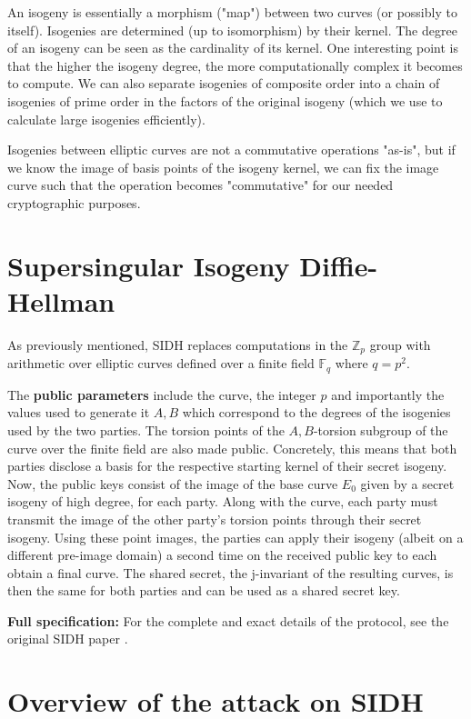 \documentclass[a4paper,11pt,oneside]{report}
\newcommand{\zp}{$\mathbb{Z}_p$\xspace}
\begin{document}
    An isogeny is essentially a morphism ("map") between two curves (or possibly to itself). Isogenies are determined (up to isomorphism) by their kernel. The degree of an isogeny can be seen as the cardinality of its kernel. One interesting point is that the higher the isogeny degree, the more computationally complex it becomes to compute. We can also separate isogenies of composite order into a chain of isogenies of prime order in the factors of the original isogeny (which we use to calculate large isogenies efficiently).

    Isogenies between elliptic curves are not a commutative operations "as-is", but if we know the image of basis points of the isogeny kernel, we can fix the image curve such that the operation becomes "commutative" for our needed cryptographic purposes.

    
\section{Supersingular Isogeny Diffie-Hellman}

    As previously mentioned, SIDH replaces computations in the \zp  group with arithmetic over elliptic curves defined over a finite field $\mathbb{F}_q$ where $q=p^2$. 

    The \textbf{public parameters} include the curve, the integer $p$ and importantly the values used to generate it $A,B$ which correspond to the degrees of the isogenies used by the two parties. The torsion points of the $A,B$-torsion subgroup of the curve over the finite field are also made public. Concretely, this means that both parties disclose a basis for the respective starting kernel of their secret isogeny.
    Now, the public keys consist of the image of the base curve $E_0$ given by a secret isogeny of high degree, for each party. Along with the curve, each party must transmit the image of the other party's torsion points through their secret isogeny.
    Using these point images, the parties can apply their isogeny (albeit on a different pre-image domain) a second time on the received public key to each obtain a final curve. The shared secret, the j-invariant of the resulting curves, is then the same for both parties and can be used as a shared secret key.

    \textbf{Full specification:} For the complete and exact details of the protocol, see the original SIDH paper \cite{original-sidh}.

\section{Overview of the attack on SIDH}
\label{attack}
\end{document}
